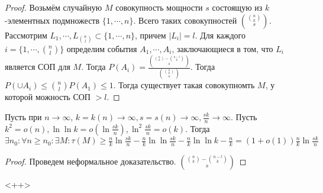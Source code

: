 \documentclass[document.tex]{subfiles}
\begin{document}
\begin{proof}
    Возьмём случайную $M$ совокупность мощности $s$ состоящую из $k$-элементных подмножеств $\{1, \cdots, n\}$. 
    Всего таких совокупностей $\binom{\binom{n}{k}}{s}$. Рассмотрим $L_1, \cdots, L_{\binom{n}{l}} \subset \{1, \cdots,
    n\}$, причем $|L_i| = l$. Для каждого $i = \{1, \cdots, \binom{n}{l}\}$ определим события $A_1, \cdots, A_i$,
    заключающиеся в том, что $L_i$ является СОП для $M$. Тогда $P(A_i) = \frac{\binom{\binom{n}{k} - \binom{n -
    l}{k}}{s}}{\binom{\binom{n}{k}}{s}}$. Тогда $P(\cup A_i) \leq \binom{n}{l} P(A_1) \leq 1$. Тогда существует такая
    совокупномть $M$, у которой можность СОП $> l$.
\end{proof}

\begin{corollary}
    Пусть при $n \rightarrow \infty$, $k = k(n) \rightarrow \infty, s = s(n) \rightarrow \infty, \frac{sk}{n}
    \rightarrow \infty$. Пусть $k^2 = o(n), \ln \ln k = o(\ln \frac{sk}{n}), \ln^2 \frac{sk}{n} = o(k)$. Тогда $\exists
    n_0: \forall n \geq n_0: \exists M: \tau(M) \geq \frac{n}{k}\ln \frac{sk}{n} - \frac{n}{k}\ln \ln
    \frac{sk}{n} - \frac{n}{k}\ln \ln k - \frac{n}{k} = (1 + o(1)) \frac{n}{k}\ln \frac{sk}{n}$
\end{corollary}

\begin{proof}
    Проведем неформальное доказательство. $\binom{\binom{n}{k} - \binom{n - l}{k}}{s}$
\end{proof}<++>
\end{document}
